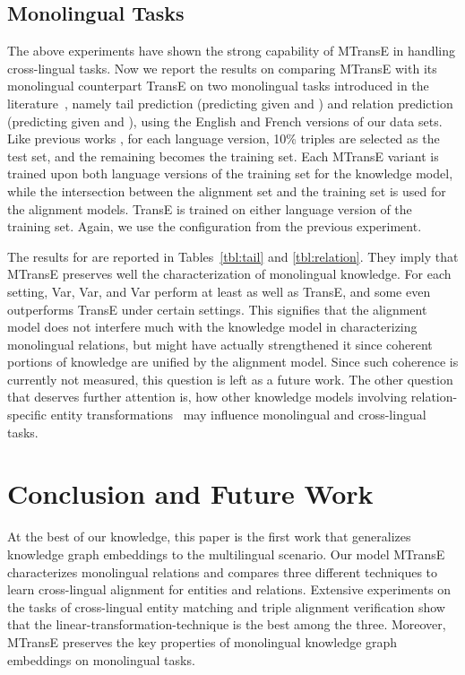 \documentclass{article}
\def\inv{\vspace{-0.1cm}}
\begin{document}
\subsection{Monolingual Tasks}
The above experiments have shown the strong capability of MTransE in handling cross-lingual tasks. Now we report the results on comparing MTransE with its monolingual counterpart TransE on two monolingual tasks introduced in the literature~\cite{bordes2013translating,bordes2014open}, namely tail prediction (predicting  given  and ) and relation prediction (predicting  given  and ), using the English and French versions of our data sets.
Like previous works \cite{bordes2013translating,wang2014knowledge,jia2016locally},
for each language version, 10\% triples are selected as the test set, and the remaining becomes the training set. Each MTransE variant is trained upon both language versions of the training set for the knowledge model, while the intersection between the alignment set and the training set is used for the alignment models. TransE is trained on either language version of the training set. Again, we use the configuration from the previous experiment. \par



 The results for  are reported in Tables~\ref{tbl:tail} and \ref{tbl:relation}.
They imply that MTransE preserves well the characterization of monolingual knowledge. For each setting, Var, Var, and Var perform at least as well as TransE, and some even outperforms TransE under certain settings. This signifies that the alignment model does not interfere much with the knowledge model in characterizing monolingual relations,
but might have actually strengthened it since coherent portions of knowledge are unified by the alignment model.
\mbox{Since} such coherence is currently not measured, this question is left as a future work.
The other question that deserves further attention is,
how other knowledge models involving relation-specific entity transformations~\cite{wang2014knowledge,lin2015learning,ji2015knowledge,jia2016locally,nguyenstranse} may influence monolingual and cross-lingual tasks.


\inv
\section{Conclusion and Future Work}
At the best of our knowledge, this paper is the first work that
generalizes knowledge graph embeddings to the multilingual scenario.
Our model MTransE characterizes monolingual relations and compares three different techniques to learn cross-lingual alignment for entities and \mbox{relations}.
Extensive experiments on the tasks of cross-lingual \mbox{entity} matching and triple alignment verification show that the linear-transformation-technique is the best among the three. Moreover,
MTransE preserves the key properties of monolingual knowledge graph embeddings on monolingual tasks. \par
\end{document}
